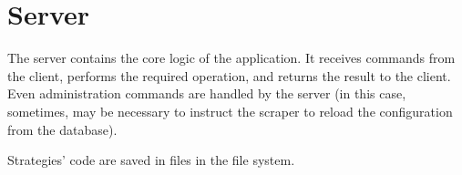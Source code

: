 \section{Server}\label{sec:server}

The server contains the core logic of the application. It receives commands from
the client, performs the required operation, and returns the result to the
client. Even administration commands are handled by the server (in this case,
sometimes, may be necessary to instruct the scraper to reload the configuration
from the database).

Strategies' code are saved in files in the file system.
